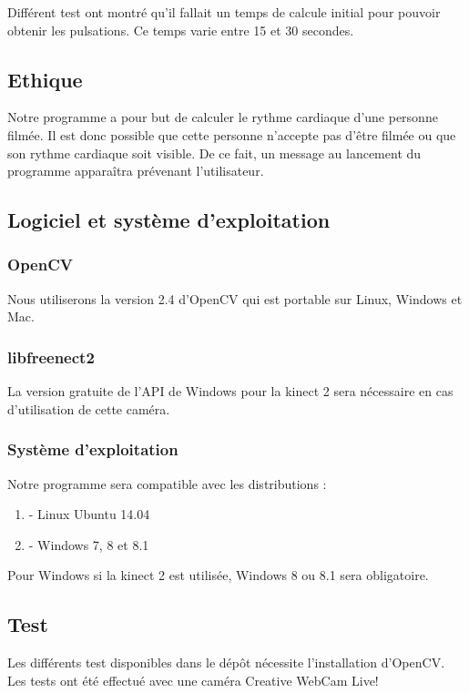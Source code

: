 \documentclass[12pt,a4paper]{article}
\begin{document}
Différent test ont montré qu'il fallait un temps de calcule initial pour pouvoir obtenir les pulsations. Ce temps varie entre 15 et 30 secondes.

\subsection{Ethique}

Notre programme a pour but de calculer le rythme cardiaque d'une personne filmée. Il est donc possible que cette personne n'accepte pas d'être filmée ou que son rythme cardiaque soit visible. De ce fait, un message au lancement du programme apparaîtra prévenant l'utilisateur.
\newpage
\subsection{Logiciel et système d'exploitation}

\subsubsection{OpenCV}

Nous utiliserons la version 2.4 d'OpenCV qui est portable sur Linux, Windows et Mac.

\subsubsection{libfreenect2}

La version gratuite de l'API de Windows pour la kinect 2 sera nécessaire en cas d'utilisation de cette caméra.


\subsubsection{Système d'exploitation}

Notre programme sera compatible avec les distributions : 
\begin{enumerate}
\item[] - Linux Ubuntu 14.04
\item[] - Windows 7, 8 et 8.1
\end{enumerate}
Pour Windows si la kinect 2 est utilisée, Windows 8 ou 8.1 sera obligatoire.

\subsection{Test}
Les différents test disponibles dans le dépôt nécessite l'installation d'OpenCV.
Les tests ont été effectué avec une caméra Creative WebCam Live!
\end{document}
